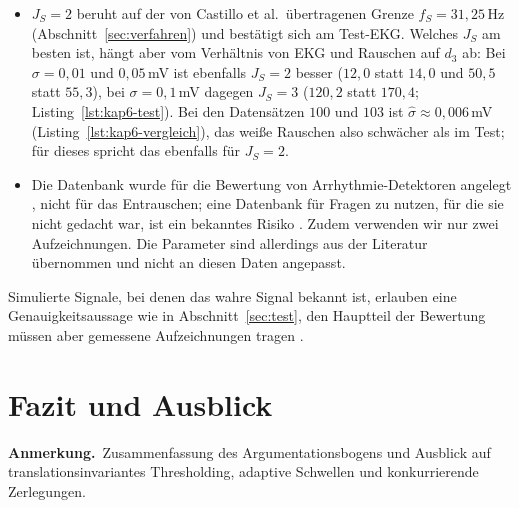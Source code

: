 \documentclass[a4paper,11pt,bibliography=totoc,listof=totoc,headinclude=true,cleardoublepage=empty,oneside]{scrbook}
\newcommand{\anmerkung}[1]{%
  \par\smallskip
  {\color{uhh_red}\small\textbf{Anmerkung.}\ #1}%
  \par\medskip}
\theoremstyle{plain}
\theoremstyle{definition}
\begin{document}
\begin{itemize}
  \cite[Abschn.~3.1.5]{castillo}. %
  Muskelrauschen liegt bei $20$ bis $80$\,Hz (Tabelle~\ref{tab:stoerungen}),
  also vor allem in $d_2$ und $d_3$. Auf $d_3$ bleibt es unverändert stehen,
  und auf $d_2$ ist die aus $d_1$ geschätzte Schwelle womöglich zu klein;
  das Muskelrauschen wird also nur unvollständig entfernt.
\item $J_S = 2$ beruht auf der von Castillo et al.\ übertragenen Grenze
  $f_S = 31{,}25$\,Hz (Abschnitt~\ref{sec:verfahren}) und bestätigt sich am
  Test-EKG. Welches $J_S$ am besten ist, hängt aber vom Verhältnis von EKG
  und Rauschen auf $d_3$ ab: Bei $\sigma = 0{,}01$ und $0{,}05$\,mV ist
  ebenfalls $J_S = 2$ besser ($12{,}0$ statt $14{,}0$ und $50{,}5$ statt
  $55{,}3$), bei $\sigma = 0{,}1$\,mV dagegen $J_S = 3$ ($120{,}2$ statt
  $170{,}4$; Listing~\ref{lst:kap6-test}).
  Bei den Datensätzen $100$ und $103$ ist $\hat\sigma \approx 0{,}006$\,mV
  (Listing~\ref{lst:kap6-vergleich}), das wei\ss e Rauschen also schwächer
  als im Test; für dieses spricht das ebenfalls für $J_S = 2$.
\item Die Datenbank wurde für die Bewertung von Arrhythmie-Detektoren angelegt
  \cite{mitbih}, %
  nicht für das Entrauschen; eine Datenbank für Fragen zu nutzen, für die sie
  nicht gedacht war, ist ein bekanntes Risiko \cite[Kap.~1.4.1]{sornmo}. %
  Zudem verwenden wir nur zwei Aufzeichnungen. Die Parameter sind allerdings
  aus der Literatur übernommen und nicht an diesen Daten angepasst.
\end{itemize}

Simulierte Signale, bei denen das wahre Signal bekannt ist, erlauben eine
Genauigkeitsaussage wie in Abschnitt~\ref{sec:test}, den Hauptteil der
Bewertung müssen aber gemessene Aufzeichnungen tragen
\cite[Kap.~1.4.2]{sornmo}. %

\chapter{Fazit und Ausblick}
\label{chapter:fazit}

\anmerkung{Zusammenfassung des Argumentationsbogens und Ausblick auf translationsinvariantes Thresholding, adaptive Schwellen und konkurrierende Zerlegungen.}
\end{document}
